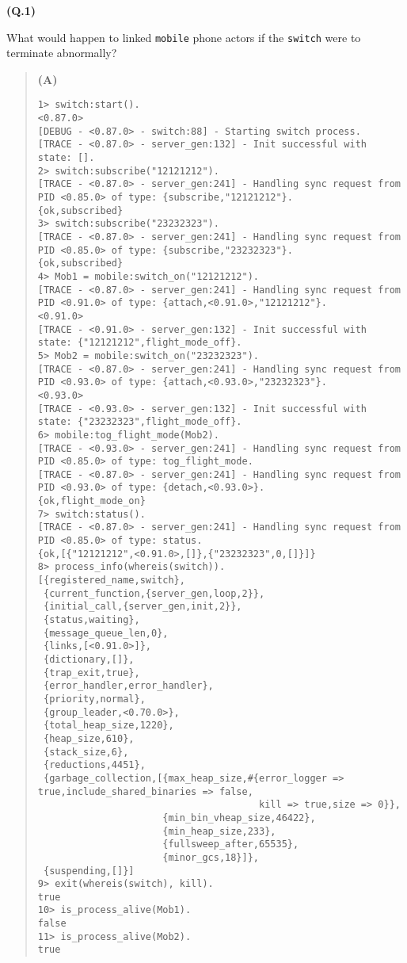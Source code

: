 \documentclass{article}
\newcommand\Que[2]{%
\vspace{10pt}
{\large\textbf{(Q.#1)}}

\vspace{5pt}
#2
}
\newenvironment{ans}
    {\begin{quote}{\large\textbf{(A)}}\\\vspace{5pt}}
    {\end{quote}}
\begin{document}
\Que{1}{
What would happen to linked \texttt{mobile} phone actors if the
\texttt{switch} were to terminate abnormally?
}

\begin{ans}
\begin{lstlisting}[basicstyle=\small\ttfamily,breaklines=true]
1> switch:start().
<0.87.0>
[DEBUG - <0.87.0> - switch:88] - Starting switch process.
[TRACE - <0.87.0> - server_gen:132] - Init successful with state: [].
2> switch:subscribe("12121212").
[TRACE - <0.87.0> - server_gen:241] - Handling sync request from PID <0.85.0> of type: {subscribe,"12121212"}.
{ok,subscribed}
3> switch:subscribe("23232323").
[TRACE - <0.87.0> - server_gen:241] - Handling sync request from PID <0.85.0> of type: {subscribe,"23232323"}.
{ok,subscribed}
4> Mob1 = mobile:switch_on("12121212").
[TRACE - <0.87.0> - server_gen:241] - Handling sync request from PID <0.91.0> of type: {attach,<0.91.0>,"12121212"}.
<0.91.0>
[TRACE - <0.91.0> - server_gen:132] - Init successful with state: {"12121212",flight_mode_off}.
5> Mob2 = mobile:switch_on("23232323").
[TRACE - <0.87.0> - server_gen:241] - Handling sync request from PID <0.93.0> of type: {attach,<0.93.0>,"23232323"}.
<0.93.0>
[TRACE - <0.93.0> - server_gen:132] - Init successful with state: {"23232323",flight_mode_off}.
6> mobile:tog_flight_mode(Mob2).
[TRACE - <0.93.0> - server_gen:241] - Handling sync request from PID <0.85.0> of type: tog_flight_mode.
[TRACE - <0.87.0> - server_gen:241] - Handling sync request from PID <0.93.0> of type: {detach,<0.93.0>}.
{ok,flight_mode_on}
7> switch:status().
[TRACE - <0.87.0> - server_gen:241] - Handling sync request from PID <0.85.0> of type: status.
{ok,[{"12121212",<0.91.0>,[]},{"23232323",0,[]}]}
8> process_info(whereis(switch)).
[{registered_name,switch},
 {current_function,{server_gen,loop,2}},
 {initial_call,{server_gen,init,2}},
 {status,waiting},
 {message_queue_len,0},
 {links,[<0.91.0>]},
 {dictionary,[]},
 {trap_exit,true},
 {error_handler,error_handler},
 {priority,normal},
 {group_leader,<0.70.0>},
 {total_heap_size,1220},
 {heap_size,610},
 {stack_size,6},
 {reductions,4451},
 {garbage_collection,[{max_heap_size,#{error_logger => true,include_shared_binaries => false,
                                       kill => true,size => 0}},
                      {min_bin_vheap_size,46422},
                      {min_heap_size,233},
                      {fullsweep_after,65535},
                      {minor_gcs,18}]},
 {suspending,[]}]
9> exit(whereis(switch), kill).
true
10> is_process_alive(Mob1).
false
11> is_process_alive(Mob2).
true
\end{lstlisting}


\end{ans}
\end{document}
